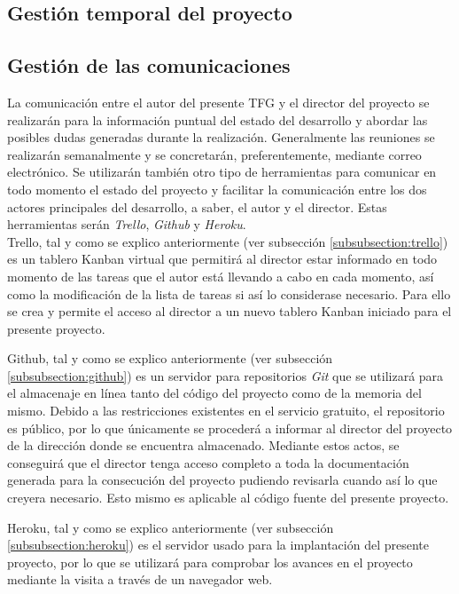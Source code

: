 	\subsection{Gestión temporal del proyecto}
	
	\subsection{Gestión de las comunicaciones}
	La comunicación entre el autor del presente \ac{TFG} y el director del proyecto se realizarán para la información puntual del estado del desarrollo y abordar las posibles dudas generadas durante la realización. Generalmente las reuniones se realizarán semanalmente y se concretarán, preferentemente, mediante correo electrónico.
	Se utilizarán también otro tipo de herramientas para comunicar en todo momento el estado del proyecto y facilitar la comunicación entre los dos actores principales del desarrollo, a saber, el autor y el director. Estas herramientas serán \textit{Trello}, \textit{Github} y \textit{Heroku}.\\
	Trello, tal y como se explico anteriormente (ver subsección \ref{subsubsection:trello}) es un tablero Kanban virtual que permitirá al director estar informado en todo momento de las tareas que el autor está llevando a cabo en cada momento, así como la modificación de la lista de tareas si así lo considerase necesario. Para ello se crea y permite el acceso al director a un nuevo tablero Kanban iniciado para el presente proyecto.
	
	Github, tal y como se explico anteriormente (ver subsección \ref{subsubsection:github}) es un servidor para repositorios \textit{Git} que se utilizará para el almacenaje en línea tanto del código del proyecto como de la memoria del mismo. Debido a las restricciones existentes en el servicio gratuito, el repositorio es público, por lo que únicamente se procederá a informar al director del proyecto de la dirección donde se encuentra almacenado. Mediante estos actos, se conseguirá que el director tenga acceso completo a toda la documentación generada para la consecución del proyecto pudiendo revisarla cuando así lo que creyera necesario. Esto mismo es aplicable al código fuente del presente proyecto.
	
	Heroku, tal y como se explico anteriormente (ver subsección \ref{subsubsection:heroku}) es el servidor usado para la implantación del presente proyecto, por lo que se utilizará para comprobar los avances en el proyecto mediante la visita a través de un navegador web.
	
